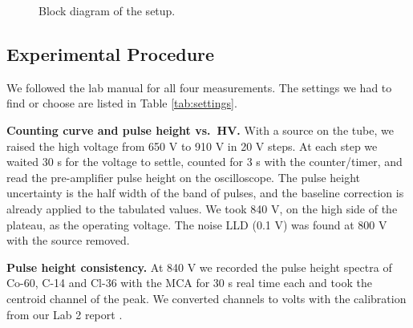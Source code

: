 \documentclass[12pt]{article}
\begin{document}
\begin{figure}[!htbp]
\centering
{}
\caption{Block diagram of the setup.}
\label{fig:block}
\end{figure}

\subsection{Experimental Procedure}

We followed the lab manual \cite{labmanual} for all four measurements. The settings we had to find or choose are listed in Table \ref{tab:settings}.

\textbf{Counting curve and pulse height vs.\ HV.} With a source on the tube, we raised the high voltage from 650 V to 910 V in 20 V steps. At each step we waited 30 s for the voltage to settle, counted for 3 s with the counter/timer, and read the pre-amplifier pulse height on the oscilloscope. The pulse height uncertainty is the half width of the band of pulses, and the baseline correction is already applied to the tabulated values.  We took 840 V, on the high side of the plateau, as the operating voltage. The noise LLD (0.1 V) was found at 800 V with the source removed.

\textbf{Pulse height consistency.} At 840 V we recorded the pulse height spectra of Co-60, C-14 and Cl-36 with the MCA for 30 s real time each and took the centroid channel of the peak. We converted channels to volts with the calibration from our Lab 2 report \cite{lab2}.
\end{document}
